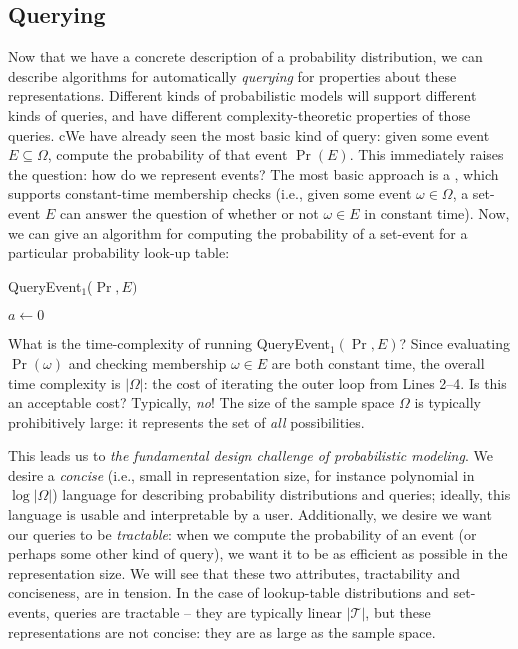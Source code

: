 \documentclass{tufte-handout}
\begin{document}
\subsection{Querying}
Now that we have a concrete description of a probability distribution, we can
describe algorithms for automatically \emph{querying} for properties about these
representations. Different kinds of probabilistic models will support different 
kinds of queries, and have different complexity-theoretic properties of those queries. cWe have already seen the most basic kind of query: given some 
event $E \subseteq \Omega$, compute the probability of that event $\Pr(E)$. 
This immediately raises the question: how do we represent events? The most basic 
approach is a , which supports constant-time membership checks 
(i.e., given some event $\omega \in \Omega$, a set-event $E$ can answer the question 
of whether or not $\omega \in E$ in constant time).
Now, we can give an algorithm for computing the probability of a set-event for 
a particular probability look-up table:

\begin{algorithm}
    \caption{QueryEvent$_1$($\Pr, E)$}\label{alg:eventprob}
    $a \leftarrow 0$\;
\end{algorithm}

What is the time-complexity of running QueryEvent$_1(\Pr, E)$? Since evaluating
$\Pr(\omega)$ and checking membership $\omega \in E$ are both constant time, the
overall time complexity is $|\Omega|$: the cost of iterating the outer loop from
Lines 2--4.  Is this an acceptable cost? Typically, \emph{no}! The size of the
sample space $\Omega$ is typically prohibitively large: it represents the set of
\emph{all} possibilities. 

This leads us to \emph{the fundamental design challenge of probabilistic modeling}.
We desire a \emph{concise} (i.e., small in representation size, for instance polynomial in $\log |\Omega|$) language for describing 
probability distributions and queries; ideally, this language is usable and interpretable 
by a user. Additionally, we desire we want our queries to be \emph{tractable}: when we 
compute the probability of an event (or perhaps some other kind of query), we want it to 
be as efficient as possible in the representation size. We will see that these two attributes,
tractability and conciseness, are in tension. In the case of lookup-table
distributions and set-events, queries are tractable -- they are typically linear $|\mathcal{T}|$,
but these representations are not concise: they are as large as the sample space.
\end{document}
